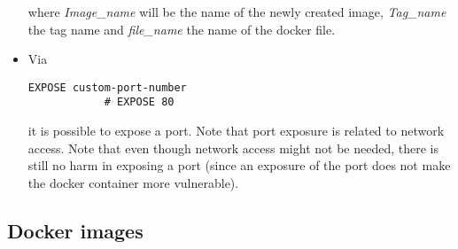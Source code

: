 \documentclass[12pt, a4paper]{article}
\numberwithin{equation}{section}
\theoremstyle{definition}
\theoremstyle{definition}
\begin{document}
\begin{itemize}
		where \textit{Image\_name} will be the name of the newly created image, \textit{Tag\_name} the tag name and \textit{file\_name} the name of the docker file. 
		
		\item Via 
		
		\begin{lstlisting}[style=mystylebash, label=alg:docker__expose_port, xleftmargin=\parindent]
			EXPOSE custom-port-number
			# EXPOSE 80
		\end{lstlisting}
	
		it is possible to expose a port. Note that port exposure is related to network access. Note that even though network access might not be needed, there is still no harm in exposing a port (since an exposure of the port does not make the docker container more vulnerable).
		
	\end{itemize} 
	
	\subsection{Docker images}
	
\end{document}

